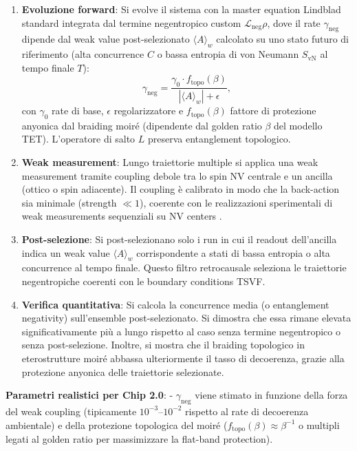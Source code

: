 \documentclass[11pt,a4paper]{article}
\let\oldcite\cite
\renewcommand{\cite}{\protect\oldcite}
\theoremstyle{plain}
\theoremstyle{definition}
\begin{document}
\begin{enumerate}
    \item \textbf{Evoluzione forward}: Si evolve il sistema con la master equation Lindblad standard integrata dal termine negentropico custom \(\mathcal{L}_{\text{neg}}\rho\), dove il rate \(\gamma_{\text{neg}}\) dipende dal weak value post-selezionato \(\langle A \rangle_w\) calcolato su uno stato futuro di riferimento (alta concurrence \(C\) o bassa entropia di von Neumann \(S_{\text{vN}}\) al tempo finale \(T\)):
    \[
    \gamma_{\text{neg}} = \frac{\gamma_0 \cdot f_{\text{topo}}(\beta)}{|\langle A \rangle_w| + \epsilon},
    \]
    con \(\gamma_0\) rate di base, \(\epsilon\) regolarizzatore e \(f_{\text{topo}}(\beta)\) fattore di protezione anyonica dal braiding moiré (dipendente dal golden ratio \(\beta\) del modello TET). L'operatore di salto \(L\) preserva entanglement topologico.

    \item \textbf{Weak measurement}: Lungo traiettorie multiple si applica una weak measurement tramite coupling debole tra lo spin NV centrale e un ancilla (ottico o spin adiacente). Il coupling è calibrato in modo che la back-action sia minimale (strength \(\ll 1\)), coerente con le realizzazioni sperimentali di weak measurements sequenziali su NV centers \cite{pfender2019,rosenthal2024}.

    \item \textbf{Post-selezione}: Si post-selezionano solo i run in cui il readout dell'ancilla indica un weak value \(\langle A \rangle_w\) corrispondente a stati di bassa entropia o alta concurrence al tempo finale. Questo filtro retrocausale seleziona le traiettorie negentropiche coerenti con le boundary conditions TSVF.

    \item \textbf{Verifica quantitativa}: Si calcola la concurrence media (o entanglement negativity) sull'ensemble post-selezionato. Si dimostra che essa rimane elevata significativamente più a lungo rispetto al caso senza termine negentropico o senza post-selezione. Inoltre, si mostra che il braiding topologico in eterostrutture moiré abbassa ulteriormente il tasso di decoerenza, grazie alla protezione anyonica delle traiettorie selezionate.
\end{enumerate}



\vspace{0.4cm}

\textbf{Parametri realistici per Chip 2.0}: 
- \(\gamma_{\text{neg}}\) viene stimato in funzione della forza del weak coupling (tipicamente \(10^{-3}\)--\(10^{-2}\) rispetto al rate di decoerenza ambientale) e della protezione topologica del moiré (\(f_{\text{topo}}(\beta) \approx \beta^{-1}\) o multipli legati al golden ratio per massimizzare la flat-band protection).
\end{document}

